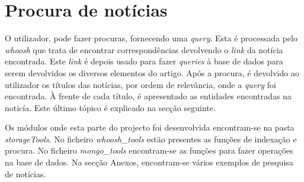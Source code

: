 \section{Procura de notícias}
O utilizador, pode fazer procuras, fornecendo uma \textit{query}. Esta é processada pelo \textit{whoosh} que trata de encontrar correspondências devolvendo o \textit{link} da notícia encontrada. Este \textit{link} é depois usado para fazer \textit{queries} à base de dados para serem devolvidos os diversos elementos do artigo. Após a procura, é devolvido ao utilizador os títulos das notícias, por ordem de relevância, onde a \textit{query} foi encontrada. À frente de cada título, é apresentado as entidades encontradas na noticía. Este último tópico é explicado na secção seguinte.

Os módulos onde esta parte do projecto foi desenvolvida encontram-se na pasta \textit{storageTools}. No ficheiro \textit{whoosh\_tools} estão presentes as funções de indexação e procura. No ficheiro \textit{mongo\_tools} encontram-se as funções para fazer operações na base de dados.
Na secção Anexos, encontram-se vários exemplos de pesquisa de notícias.